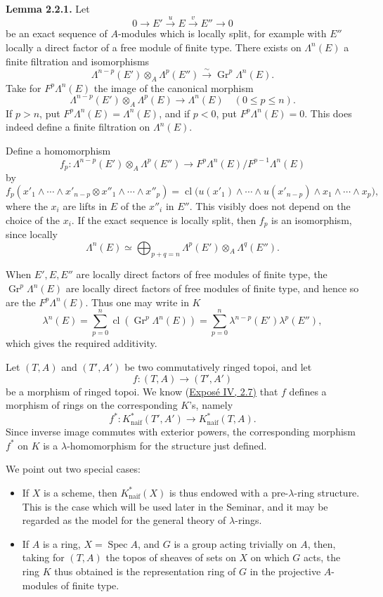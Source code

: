 \textbf{Lemma 2.2.1.} Let
\[
  0\longrightarrow E' \xrightarrow{u} E \xrightarrow{v} E''\longrightarrow 0
\]
be an exact sequence of \(A\)-modules which is locally split, for example with \(E''\) locally a direct factor of a free module of finite type. There exists on \(\Lambda^n(E)\) a finite filtration and isomorphisms
\[
  \Lambda^{n-p}(E')\otimes_A\Lambda^p(E'')
  \xrightarrow{\sim}
  \operatorname{Gr}^p\Lambda^n(E).
\]
Take for \(F^p\Lambda^n(E)\) the image of the canonical morphism
\[
  \Lambda^{n-p}(E')\otimes_A\Lambda^p(E)\longrightarrow \Lambda^n(E)
  \quad (0\leq p\leq n).
\]
If \(p>n\), put \(F^p\Lambda^n(E)=\Lambda^n(E)\), and if \(p<0\), put \(F^p\Lambda^n(E)=0\). This does indeed define a finite filtration on \(\Lambda^n(E)\).

Define a homomorphism
\[
  f_p:\Lambda^{n-p}(E')\otimes_A\Lambda^p(E'')
  \longrightarrow
  F^p\Lambda^n(E)/F^{p-1}\Lambda^n(E)
\]
by
\[
  f_p(x'_1\wedge\cdots\wedge x'_{n-p}\otimes x''_1\wedge\cdots\wedge x''_p)
  =
  \operatorname{cl}\bigl(u(x'_1)\wedge\cdots\wedge u(x'_{n-p})\wedge
  x_1\wedge\cdots\wedge x_p\bigr),
\]
where the \(x_i\) are lifts in \(E\) of the \(x''_i\) in \(E''\). This visibly does not depend on the choice of the \(x_i\). If the exact sequence is locally split, then \(f_p\) is an isomorphism, since locally
\[
  \Lambda^n(E)\simeq\bigoplus_{p+q=n}
  \Lambda^p(E')\otimes_A\Lambda^q(E'').
\]

When \(E',E,E''\) are locally direct factors of free modules of finite type, the \(\operatorname{Gr}^p\Lambda^n(E)\) are locally direct factors of free modules of finite type, and hence so are the \(F^p\Lambda^n(E)\). Thus one may write in \(K\)
\[
  \lambda^n(E)=\sum_{p=0}^{n}\operatorname{cl}(\operatorname{Gr}^p\Lambda^n(E))
  =
  \sum_{p=0}^{n}\lambda^{n-p}(E')\lambda^p(E''),
\]
which gives the required additivity.

Let \((T,A)\) and \((T',A')\) be two commutatively ringed topoi, and let
\[
  f:(T,A)\longrightarrow (T',A')
\]
be a morphism of ringed topoi. We know (\hyperlink{sga6.e04.para.2-7}{Exposé IV, 2.7)} that \(f\) defines a morphism of rings on the corresponding \(K\)'s, namely
\[
  f^*:K^*_{\mathrm{naif}}(T',A')\longrightarrow K^*_{\mathrm{naif}}(T,A).
\]
Since inverse image commutes with exterior powers, the corresponding morphism \(f^*\) on \(K\) is a \(\lambda\)-homomorphism for the structure just defined.

We point out two special cases:
\begin{itemize}
\item If \(X\) is a scheme, then \(K^*_{\mathrm{naif}}(X)\) is thus endowed with a pre-\(\lambda\)-ring structure. This is the case which will be used later in the Seminar, and it may be regarded as the model for the general theory of \(\lambda\)-rings.
\item If \(A\) is a ring, \(X=\operatorname{Spec}A\), and \(G\) is a group acting trivially on \(A\), then, taking for \((T,A)\) the topos of sheaves of sets on \(X\) on which \(G\) acts, the ring \(K\) thus obtained is the representation ring of \(G\) in the projective \(A\)-modules of finite type.
\end{itemize}

